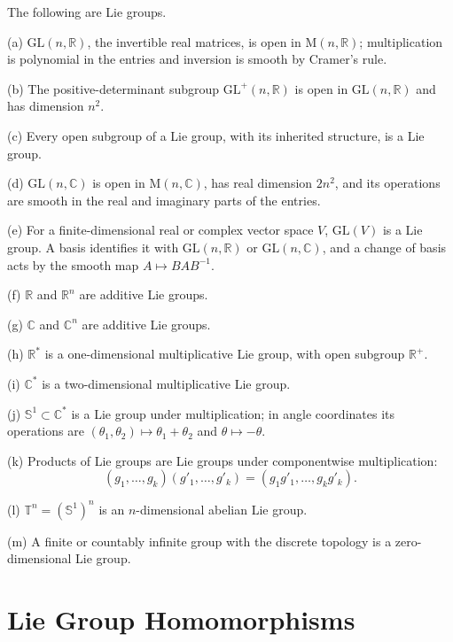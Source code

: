 \begin{example}
\label{ex:7-3}
\mathlibok
{}
The following are Lie groups.

(a) $\mathrm{GL}(n,\mathbb R)$, the invertible real matrices, is open in
$\mathrm M(n,\mathbb R)$; multiplication is polynomial in the entries and
inversion is smooth by Cramer's rule.

(b) The positive-determinant subgroup $\mathrm{GL}^{+}(n,\mathbb R)$ is open
in $\mathrm{GL}(n,\mathbb R)$ and has dimension $n^2$.

(c) Every open subgroup of a Lie group, with its inherited structure, is a Lie
group.

(d) $\mathrm{GL}(n,\mathbb C)$ is open in $\mathrm M(n,\mathbb C)$, has real
dimension $2n^2$, and its operations are smooth in the real and imaginary
parts of the entries.

(e) For a finite-dimensional real or complex vector space $V$,
$\mathrm{GL}(V)$ is a Lie group. A basis identifies it with
$\mathrm{GL}(n,\mathbb R)$ or $\mathrm{GL}(n,\mathbb C)$, and a change of
basis acts by the smooth map $A\mapsto BAB^{-1}$.

(f) $\mathbb R$ and $\mathbb R^n$ are additive Lie groups.

(g) $\mathbb C$ and $\mathbb C^n$ are additive Lie groups.

(h) $\mathbb R^{*}$ is a one-dimensional multiplicative Lie group, with open
subgroup $\mathbb R^{+}$.

(i) $\mathbb C^{*}$ is a two-dimensional multiplicative Lie group.

(j) $\mathbb S^1\subset\mathbb C^{*}$ is a Lie group under multiplication; in
angle coordinates its operations are
$(\theta_1,\theta_2)\mapsto\theta_1+\theta_2$ and $\theta\mapsto-\theta$.

(k) Products of Lie groups are Lie groups under componentwise multiplication:
\[
(g_1,\ldots,g_k)(g'_1,\ldots,g'_k)
=(g_1g'_1,\ldots,g_kg'_k).
\]

(l) $\mathbb T^n=(\mathbb S^1)^n$ is an $n$-dimensional abelian Lie group.

(m) A finite or countably infinite group with the discrete topology is a
zero-dimensional Lie group.
\end{example}

\section{Lie Group Homomorphisms}

